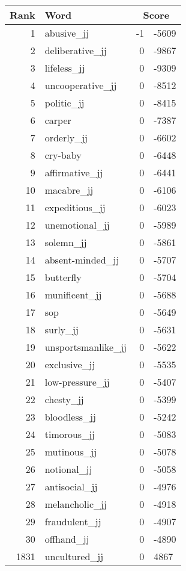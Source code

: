\begin{longtable}[!htbp]{| rlr@{.}l |}
    \hline
    \textbf{Rank} & \textbf{Word} & \multicolumn{2}{c|}{\textbf{Score}} \\
    \hline
    \endhead
    1 & abusive\_jj & -1 & -5609 \\
    2 & deliberative\_jj & 0 & -9867 \\
    3 & lifeless\_jj & 0 & -9309 \\
    4 & uncooperative\_jj & 0 & -8512 \\
    5 & politic\_jj & 0 & -8415 \\
    6 & carper & 0 & -7387 \\
    7 & orderly\_jj & 0 & -6602 \\
    8 & cry-baby & 0 & -6448 \\
    9 & affirmative\_jj & 0 & -6441 \\
    10 & macabre\_jj & 0 & -6106 \\
    11 & expeditious\_jj & 0 & -6023 \\
    12 & unemotional\_jj & 0 & -5989 \\
    13 & solemn\_jj & 0 & -5861 \\
    14 & absent-minded\_jj & 0 & -5707 \\
    15 & butterfly & 0 & -5704 \\
    16 & munificent\_jj & 0 & -5688 \\
    17 & sop & 0 & -5649 \\
    18 & surly\_jj & 0 & -5631 \\
    19 & unsportsmanlike\_jj & 0 & -5622 \\
    20 & exclusive\_jj & 0 & -5535 \\
    21 & low-pressure\_jj & 0 & -5407 \\
    22 & chesty\_jj & 0 & -5399 \\
    23 & bloodless\_jj & 0 & -5242 \\
    24 & timorous\_jj & 0 & -5083 \\
    25 & mutinous\_jj & 0 & -5078 \\
    26 & notional\_jj & 0 & -5058 \\
    27 & antisocial\_jj & 0 & -4976 \\
    28 & melancholic\_jj & 0 & -4918 \\
    29 & fraudulent\_jj & 0 & -4907 \\
    30 & offhand\_jj & 0 & -4890 \\
    1831 & uncultured\_jj & 0 & 4867 \\

\end{longtable}
